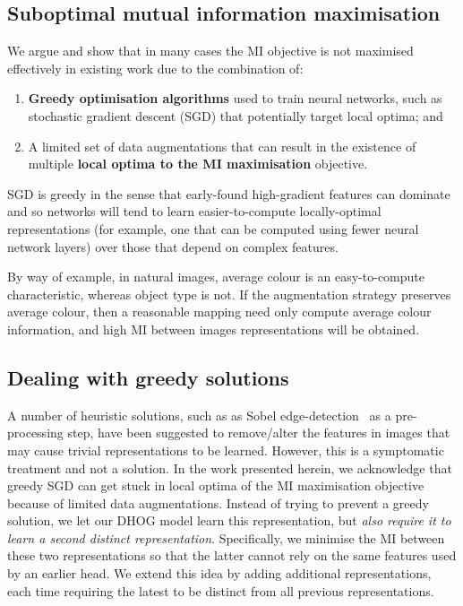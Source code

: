 \documentclass[runningheads]{llncs}
\begin{document}
\subsection{Suboptimal mutual information maximisation}

We argue and show that in many cases the MI objective is not maximised effectively in existing work due to the combination of:
\begin{enumerate}
   
\item \textbf{Greedy optimisation algorithms} used to train neural networks, such as stochastic gradient descent (SGD) that potentially target local optima; and
     \item A limited set of data augmentations that can result in the existence of multiple \textbf{local optima to the MI maximisation} objective.
\end{enumerate}

SGD is greedy in the sense that early-found high-gradient features can dominate and so networks will tend to learn easier-to-compute locally-optimal representations (for example, one that can be computed using fewer neural network layers) over those that depend on complex features. 

By way of example, in natural images, average colour is an easy-to-compute characteristic, whereas object type is not. If the augmentation strategy preserves average colour, then a reasonable mapping need only compute average colour information, and high MI between images representations will be obtained.
 

\subsection{Dealing with greedy solutions}

A number of heuristic solutions, such as as Sobel edge-detection~\cite{caron2018deep, ji2019invariant} as a pre-processing step, have been suggested to remove/alter the features in images that may cause trivial representations to be learned. However, this is a symptomatic treatment and not a solution. In the work presented herein, we acknowledge that greedy SGD can get stuck in local optima of the MI maximisation objective because of limited data augmentations. Instead of trying to prevent a greedy solution, we let our DHOG model learn this representation, but \emph{also require it to learn a second distinct representation}. Specifically, we minimise the MI between these two representations so that the latter cannot rely on the same features used by an earlier head. We extend this idea by adding additional representations, each time requiring the latest to be distinct from all previous representations.
\end{document}

